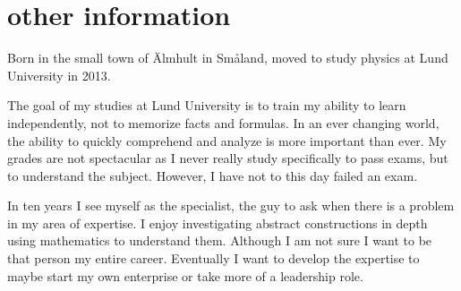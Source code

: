 \documentclass[]{twentysecondcv}
\begin{document}
\section{other information}
Born in the small town of \"Almhult in Sm\aa land, moved to study
physics at Lund University in 2013.

The goal of my studies at Lund University is to train my ability to
learn independently, not to memorize facts and formulas. In an ever
changing world, the ability to quickly comprehend and analyze is more
important than ever. My grades are not spectacular as I never really
study specifically to pass exams, but to understand the
subject. However, I have not to this day failed an exam. 

In ten years I see myself as the specialist, the guy to ask when there
is a problem in my area of expertise. I enjoy investigating abstract
constructions in depth using mathematics to understand them. Although I
am not sure I want to be that person my entire career. Eventually I
want to develop the expertise to maybe start my own enterprise or take
more of a leadership role.

\end{document}
